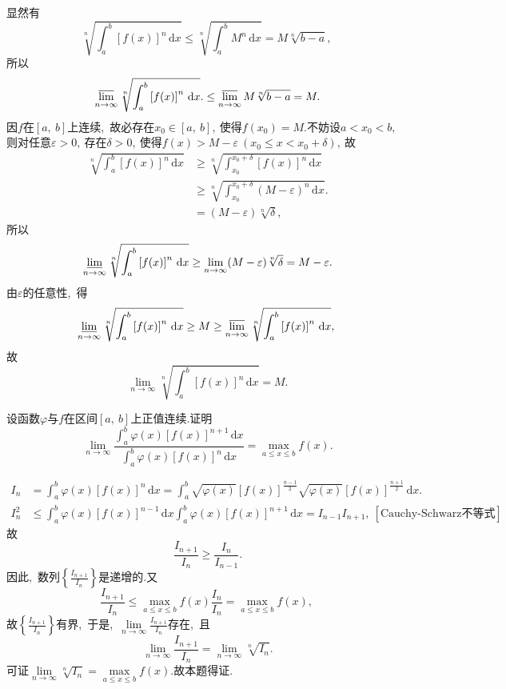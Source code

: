 	\begin{solution}
		显然有
		$$\sqrt[n]{\int_{a}^{b}\left[f(x)\right]^n\,\text{d}x}\le\sqrt[n]{\int_{a}^{b}M^n\,\text{d}x}=M\sqrt[n]{b-a},\ $$
		所以
		$$\varlimsup\limits_{n\rightarrow\infty}\sqrt[n]{\int_{a}^{b}\left[f(x)\right]^n\,\text{d}x}.\le \varlimsup\limits_{n\rightarrow\infty}M\sqrt[n]{b-a}=M.$$
		因$f$在$\left[a,\ b\right]$上连续,\ 故必存在$x_0\in \left[a,\ b\right],\ $使得$f(x_0)=M.$不妨设$a<x_0<b,\ $则对任意$\varepsilon>0,\ $存在$\delta>0,\ $使得$f(x)>M-\varepsilon\ (x_0\le x<x_0+\delta),\ $故
		\begin{align*}
			\sqrt[n]{\int_{a}^{b}\left[f(x)\right]^n\,\text{d}x}&\ge \sqrt[n]{\int_{x_0}^{x_0+\delta}\left[f(x)\right]^n\,\text{d}x}\\
			&\ge\sqrt[n]{\int_{x_0}^{x_0+\delta}(M-\varepsilon)^n\,\text{d}x}.\\
			&=(M-\varepsilon)\sqrt[n]{\delta},\ 
		\end{align*}
		所以
		$$\varliminf\limits_{n\rightarrow\infty}\sqrt[n]{\int_{a}^{b}\left[f(x)\right]^n\,\text{d}x}\ge \lim\limits_{n\rightarrow\infty}(M-\varepsilon)\sqrt[n]{\delta}=M-\varepsilon.$$
		由$\varepsilon$的任意性,\ 得
		$$\varliminf\limits_{n\rightarrow\infty}\sqrt[n]{\int_{a}^{b}\left[f(x)\right]^n\,\text{d}x}\ge M\ge \varlimsup\limits_{n\rightarrow\infty}\sqrt[n]{\int_{a}^{b}\left[f(x)\right]^n\,\text{d}x},\ $$
		故
		$$\lim\limits_{n\rightarrow\infty}\sqrt[n]{\int_{a}^{b}\left[f(x)\right]^n\,\text{d}x}=M.$$ 
	\end{solution}
	\newpage
	\begin{problem}
		设函数$\varphi$与$f$在区间$\left[a,\ b\right]$上正值连续.证明
		$$\lim\limits_{n\rightarrow\infty}\frac{\int_{a}^{b}\varphi(x)\left[f(x)\right]^{n+1}\,\text{d}x}{\int_{a}^{b}\varphi(x)\left[f(x)\right]^n\,\text{d}x}=\max\limits_{a\le x\le b}f(x).$$
	\end{problem}
	
	\begin{solution}
		\begin{align*}
			I_n&=\int_{a}^{b}\varphi(x)\left[f(x)\right]^{n}\,\text{d}x=\int_{a}^{b}\sqrt{\varphi(x)}\left[f(x)\right]^{\frac{n-1}{2}}\sqrt{\varphi(x)}\left[f(x)\right]^{\frac{n+1}{2}}\,\text{d}x.\\
			I_n^2&\le\int_{a}^{b}\varphi(x)\left[f(x)\right]^{n-1}\,\text{d}x\int_{a}^{b}\varphi(x)\left[f(x)\right]^{n+1}\,\text{d}x=I_{n-1}I_{n+1},\ \left[\text{Cauchy-Schwarz不等式}\right]
		\end{align*}
		故
		$$\frac{I_{n+1}}{I_{n}}\ge\frac{I_n}{I_{n-1}}.$$
		因此,\ 数列$\left\{\frac{I_{n+1}}{I_n}\right\}$是递增的.又
		$$\frac{I_{n+1}}{I_n}\le\max\limits_{a\le x\le b}f(x)\frac{I_n}{I_n}=\max\limits_{a\le x\le b}f(x),\ $$
		故$\left\{\frac{I_{n+1}}{I_n}\right\}$有界,\ 于是,\ $\lim\limits_{n\rightarrow\infty}\frac{I_{n+1}}{I_n}$存在,\ 且
		$$\lim\limits_{n\rightarrow\infty}\frac{I_{n+1}}{I_n}=\lim\limits_{n\rightarrow\infty}\sqrt[n]{I_n}.$$
		可证$\lim\limits_{n\rightarrow\infty}\sqrt[n]{I_n}=\max\limits_{a\le x\le b}f(x).$故本题得证. 
	\end{solution}
	

